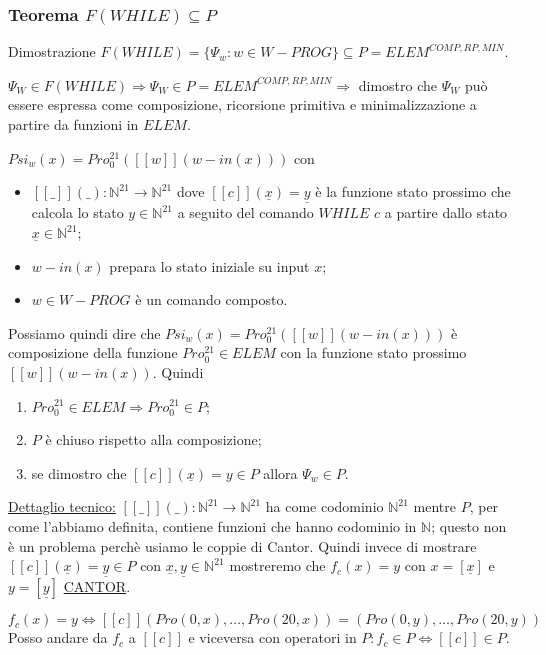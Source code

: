 \documentclass{article}
\begin{document}
\subsubsection{Teorema $F(WHILE) \subseteq P$}
Dimostrazione $F(WHILE)=\{ \Psi_w:w \in W-PROG \} \subseteq P = ELEM^{COMP,RP,MIN}$.



$\Psi_W \in F(WHILE) \Rightarrow \Psi_W \in P=ELEM^{COMP,RP,MIN} \Rightarrow$ dimostro che $\Psi_W$ può essere espressa come composizione, ricorsione primitiva e minimalizzazione a partire da funzioni in $ELEM$.



$Psi_w(x) = Pro_0^{21}([[w]](w-in(x)))$ con \begin{itemize}
	\item $[[\_]](\_) :\mathbb{N}^{21} \rightarrow \mathbb{N}^{21}$ dove $[[c]](\underline{x})=\underline{y}$ è la funzione stato prossimo che calcola lo stato $y \in \mathbb{N}^{21}$ a seguito del comando $WHILE$ $c$ a partire dallo stato $\underline{x}\in \mathbb{N}^{21}$;
	\item $w-in(x)$ prepara lo stato iniziale su input $x$;
	\item $w \in W-PROG$ è un comando composto.
\end{itemize}
Possiamo quindi dire che $Psi_w(x) = Pro_0^{21}([[w]](w-in(x)))$ è composizione della funzione $Pro_0^{21} \in ELEM$ con la funzione stato prossimo $[[w]](w-in(x))$. Quindi
\begin{enumerate}
	\item $Pro_0^{21} \in ELEM \Rightarrow Pro_0^{21} \in P$;
	\item $P$ è chiuso rispetto alla composizione;
	\item se dimostro che $[[c]](\underline{x})=y \in P$ allora $\Psi_w \in P$.
\end{enumerate}
\underline{Dettaglio tecnico:} $[[\_]](\_):\mathbb{N}^{21} \rightarrow \mathbb{N}^{21}$ ha come codominio $\mathbb{N}^{21}$ mentre $P$, per come l'abbiamo definita, contiene funzioni che hanno codominio in $\mathbb{N}$; questo non è un problema perchè usiamo le coppie di Cantor. Quindi invece di mostrare $[[c]](\underline{x})=\underline{y} \in P$ con $\underline{x},\underline{y} \in \mathbb{N}^{21}$ mostreremo che $f_c(x)=y$ con $x=[\underline{x}]$ e $y=[\underline{y}]$ \underline{{CANTOR}}.

\begin{displaymath}
f_c(x) = y \Leftrightarrow [[c]](Pro(0,x),\dots,Pro(20,x))=(Pro(0,y),\dots,Pro(20,y))
\end{displaymath}
Posso andare da $f_c$ a $[[c]]$ e viceversa con operatori in $P:f_c\in P \Leftrightarrow [[c]] \in P$.
\end{document}
